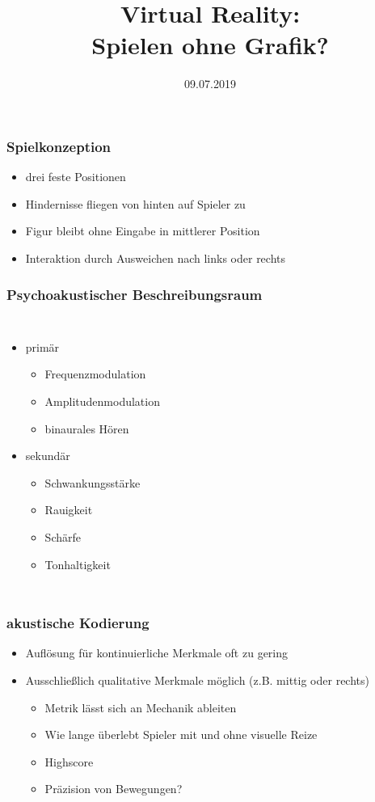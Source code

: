 \documentclass{beamer}
\title{Virtual Reality:\\Spielen ohne Grafik?}
\date{09.07.2019}
\begin{document}
\begin{frame}
\titlepage
\end{frame}

\begin{frame}
\frametitle{Spielkonzeption}

\begin{adjustbox}{max totalsize={.9\textwidth}{.7\textheight}, center}

\end{adjustbox}

\begin{itemize}
	\item drei feste Positionen
	\item Hindernisse fliegen von hinten auf Spieler zu
	\item Figur bleibt ohne Eingabe in mittlerer Position
	\item Interaktion durch Ausweichen nach links oder rechts
\end{itemize}

\end{frame}

\begin{frame}
\frametitle{Psychoakustischer Beschreibungsraum}

\begin{columns}
	\begin{itemize}
		\item primär
		\begin{itemize}
			\item Frequenzmodulation
			\item Amplitudenmodulation
			\item binaurales Hören
		\end{itemize}

		\item sekundär
		\begin{itemize}
			\item Schwankungsstärke
			\item Rauigkeit
			\item Schärfe
			\item Tonhaltigkeit
		\end{itemize}
	\end{itemize}
	
\end{columns}
\end{frame}

\begin{frame}
\frametitle{akustische Kodierung}
\begin{itemize}
	\item Auflösung für kontinuierliche Merkmale oft zu gering
	\item Ausschließlich qualitative Merkmale möglich (z.B. mittig oder rechts)
	\begin{itemize}
		\item Metrik lässt sich an Mechanik ableiten
		\item Wie lange überlebt Spieler mit und ohne visuelle Reize
		\item Highscore
		\item Präzision von Bewegungen?
	\end{itemize}
\end{itemize}
\end{frame}
\end{document}

